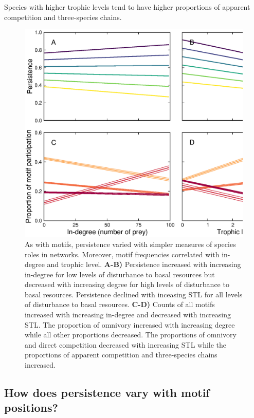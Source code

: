 \documentclass[12pt]{article}
\begin{document}
\begin{spacing}{2.0}
        Species with higher trophic levels tend to have higher proportions of apparent competition and three-species chains. 
        

            \begin{figure}
                \centering
                \includegraphics[width=\textwidth]{figures/roles_vs_TL.eps}
                \caption{As with motifs, persistence varied with simpler measures of species roles in networks. Moreover, motif frequencies correlated with in-degree and trophic level. \textbf{A-B)} Persistence increased with increasing in-degree for low levels of disturbance to basal resources but decreased with increasing degree for high levels of disturbance to basal resources.
                Persistence declined with inceasing STL for all levels of disturbance to basal resources.
                \textbf{C-D)} Counts of all motifs increased with increasing in-degree and decreased with increasing STL. The proportion of omnivory increased with increasing degree while all other proportions decreased. The proportions of omnivory and direct competition decreased with increasing STL while the proportions of apparent competition and three-species chains increased.}
                \label{fig:motifs_vs_TL_and_deg}
            \end{figure}        
        

    \subsection*{How does persistence vary with motif positions?}


\end{spacing}
\end{document}
